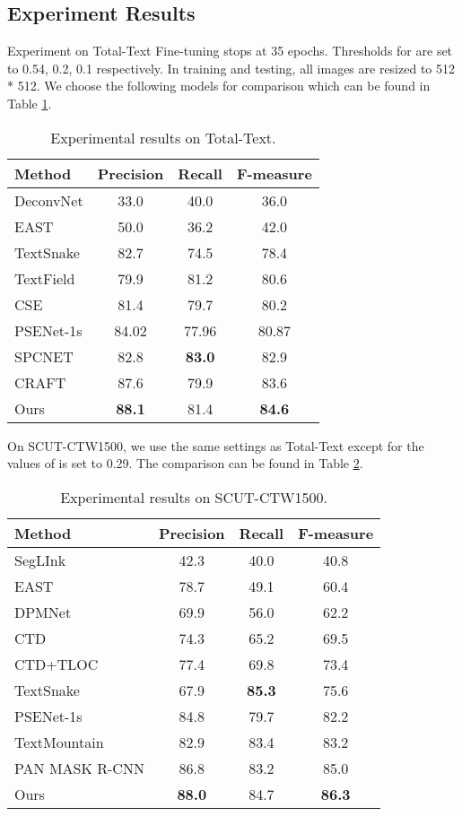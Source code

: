 \documentclass{bmvc2k}
\begin{document}
\subsection{Experiment Results}
Experiment on Total-Text Fine-tuning stops at 35 epochs. Thresholds for  are set to 0.54, 0.2, 0.1 respectively.
In training and testing, all images are resized to 512 * 512. We choose the following models for comparison which can be found in Table \ref{total}.
\begin{table}[H]
\begin{center}
\begin{tabular}{|l|c|c|c|}
\hline
Method & Precision & Recall & F-measure \\
\hline\hline
DeconvNet \cite{neumann2010method}& 33.0 &40.0 & 36.0 \\
EAST \cite{zhou2017east}& 50.0&36.2&42.0 \\
TextSnake  \cite{long2018textsnake}&82.7&74.5&78.4\\
TextField \cite{xu2019textfield}&79.9&81.2&80.6\\
CSE \cite{Liu2019Towards} &81.4&79.7&80.2\\
PSENet-1s \cite{li2018shape} &84.02&77.96&80.87\\
SPCNET\cite{xie2018scene} &82.8&\bfseries83.0&82.9\\
CRAFT \cite{baek2019character} &87.6&79.9&83.6\\
Ours & \bfseries88.1 &81.4&\bfseries84.6\\
\hline
\end{tabular}
\end{center}
\caption{Experimental results on Total-Text.}
\label{total}
\end{table}
On SCUT-CTW1500, we use the same settings as Total-Text except for the values of  is set to 0.29. The comparison can be found in Table \ref{ctw1500}.
\begin{table}[H]
\begin{center}
\begin{tabular}{|l|c|c|c|}
\hline
Method & Precision & Recall & F-measure \\
\hline\hline
SegLInk \cite{Shi2017Detecting} & 42.3 &40.0 & 40.8 \\
EAST \cite{zhou2017east} & 78.7&49.1&60.4 \\
DPMNet \cite{liu2017deep} &69.9&56.0&62.2\\
CTD \cite{Noh2015Learning}&74.3&65.2&69.5\\
CTD+TLOC \cite{Noh2015Learning}&77.4&69.8&73.4\\
TextSnake \cite{long2018textsnake}&67.9&\bfseries85.3&75.6\\
PSENet-1s \cite{li2018shape} &84.8&79.7&82.2\\
TextMountain \cite{zhu2018textmountain} & 82.9&83.4&83.2\\
PAN MASK R-CNN \cite{huang2019mask} &86.8&83.2&85.0\\
Ours & \bfseries 88.0 &84.7&\bfseries86.3\\
\hline
\end{tabular}
\end{center}
\caption{Experimental results on SCUT-CTW1500.}
\label{ctw1500}
\end{table}
\end{document}
